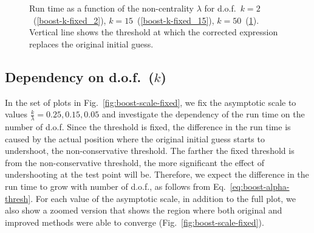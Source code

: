 \documentclass{amsart}
\numberwithin{equation}{section}
\begin{document}
\begin{figure}[h]
\begin{subfigure}[t]{0.3\textwidth}
		\caption{}\label{boost-k-fixed_50}
	\end{subfigure}
    \caption{Run time as a function of the non-centrality $\lambda$ for d.o.f.\ $k=2$~(\ref{boost-k-fixed_2}), $k=15$~(\ref{boost-k-fixed_15}), $k=50$~(\ref{boost-k-fixed_50}). Vertical line shows the threshold at which the corrected expression replaces the original initial guess.}\label{fig:boost-k-fixed}
\end{figure}
%
\subsection{Dependency on d.o.f.\ ($k$)} In the set of plots in Fig.~\ref{fig:boost-scale-fixed}, we fix the asymptotic scale to values $\frac{k}{\lambda} = 0.25, 0.15, 0.05$ and investigate the dependency of the run time on the number of d.o.f. Since the threshold is fixed, the difference in the run time is caused by the actual position where the original initial guess starts to undershoot, the non-conservative threshold. The farther the fixed threshold is from the non-conservative threshold, the more significant the effect of undershooting at the test point will be. Therefore, we expect the difference in the run time to grow with number of d.o.f., as follows from Eq.~\ref{eq:boost-alpha-thresh}. For each value of the asymptotic scale, in addition to the full plot, we also show a zoomed version that shows the region where both original and improved methods were able to converge (Fig.~\ref{fig:boost-scale-fixed}).
%
\end{document}

